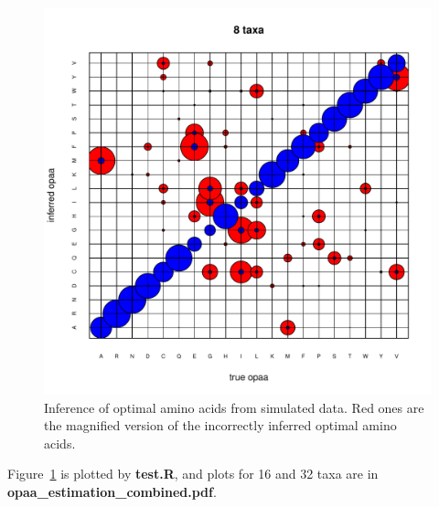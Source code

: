 \documentclass[12pt]{article}
\begin{document}
\begin{figure}[h]
\centering
\includegraphics[page=1,width=\textwidth]{opaa_estimation_combined.pdf}
\caption{Inference of optimal amino acids from simulated data. Red ones are the magnified version of the incorrectly inferred optimal amino acids.}
\label{fig:opaaEst}
\end{figure}

Figure~\ref{fig:opaaEst} is plotted by {\bf test.R}, and plots for 16 and 32 taxa are in \\{\bf opaa\_estimation\_combined.pdf}.
\end{document}
